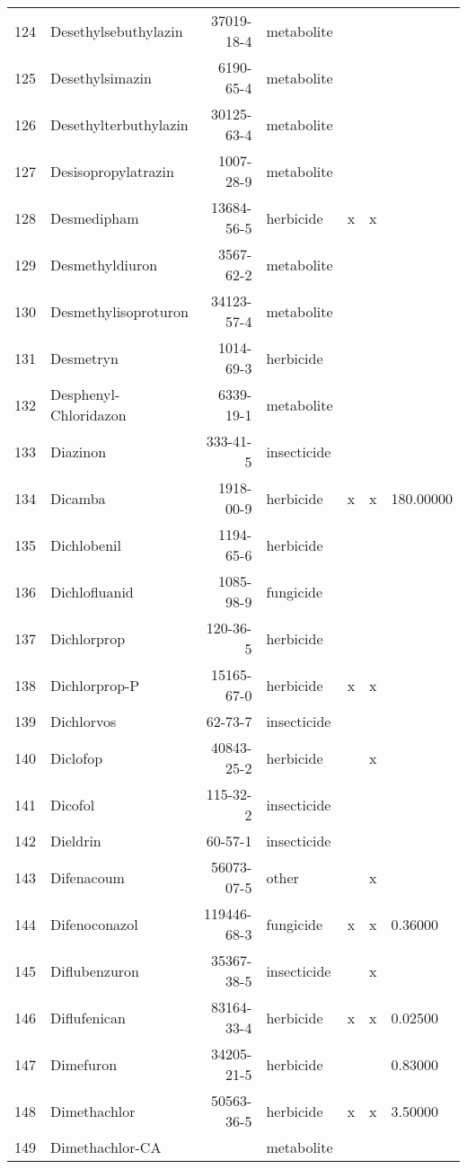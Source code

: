 \begin{longtable}{lp{4cm}rlp{1.3cm}p{1.3cm}p{1.5cm}}
  124 & Desethylsebuthylazin & 37019-18-4 & metabolite &  &  &  \\ 
  125 & Desethylsimazin & 6190-65-4 & metabolite &  &  &  \\ 
  126 & Desethylterbuthylazin & 30125-63-4 & metabolite &  &  &  \\ 
  127 & Desisopropylatrazin & 1007-28-9 & metabolite &  &  &  \\ 
  128 & Desmedipham & 13684-56-5 & herbicide & x & x &  \\ 
  129 & Desmethyldiuron & 3567-62-2 & metabolite &  &  &  \\ 
  130 & Desmethylisoproturon & 34123-57-4 & metabolite &  &  &  \\ 
  131 & Desmetryn & 1014-69-3 & herbicide &  &  &  \\ 
  132 & Desphenyl-Chloridazon & 6339-19-1 & metabolite &  &  &  \\ 
  133 & Diazinon & 333-41-5 & insecticide &  &  &  \\ 
  134 & Dicamba & 1918-00-9 & herbicide & x & x & 180.00000 \\ 
  135 & Dichlobenil & 1194-65-6 & herbicide &  &  &  \\ 
  136 & Dichlofluanid & 1085-98-9 & fungicide &  &  &  \\ 
  137 & Dichlorprop & 120-36-5 & herbicide &  &  &  \\ 
  138 & Dichlorprop-P & 15165-67-0 & herbicide & x & x &  \\ 
  139 & Dichlorvos & 62-73-7 & insecticide &  &  &  \\ 
  140 & Diclofop & 40843-25-2 & herbicide &  & x &  \\ 
  141 & Dicofol & 115-32-2 & insecticide &  &  &  \\ 
  142 & Dieldrin & 60-57-1 & insecticide &  &  &  \\ 
  143 & Difenacoum & 56073-07-5 & other &  & x &  \\ 
  144 & Difenoconazol & 119446-68-3 & fungicide & x & x & 0.36000 \\ 
  145 & Diflubenzuron & 35367-38-5 & insecticide &  & x &  \\ 
  146 & Diflufenican & 83164-33-4 & herbicide & x & x & 0.02500 \\ 
  147 & Dimefuron & 34205-21-5 & herbicide &  &  & 0.83000 \\ 
  148 & Dimethachlor & 50563-36-5 & herbicide & x & x & 3.50000 \\ 
  149 & Dimethachlor-CA &  & metabolite &  &  &  \\ 

\end{longtable}
